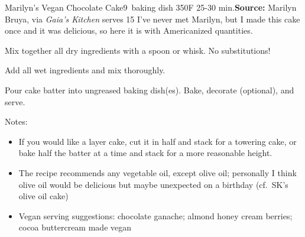 \begin{recipe}{Marilyn's Vegan Chocolate Cake}{9\inch{}\inch\ baking dish \hfill 350\0F \hfill 25-30 min.}{\textbf{Source:} Marilyn Bruya, via \textit{Gaia's Kitchen} \hfill serves 15}
  \freeform I've never met Marilyn, but I made this cake once and it was delicious, so here it is with Americanized quantities.

Mix together all dry ingredients with a spoon or whisk. No substitutions!

Add all wet ingredients and mix thoroughly.

\newstep Pour cake batter into ungreased baking dish(es). Bake, decorate (optional), and serve.

\freeform Notes:
\begin{itemize}
  \item If you would like a layer cake, cut it in half and stack for a towering cake, or bake half the batter at a time and stack for a more reasonable height.
  \item The recipe recommends any vegetable oil, except olive oil; personally I think olive oil would be delicious but maybe unexpected on a birthday (cf.\ SK's olive oil cake)
  \item Vegan serving suggestions: chocolate ganache; almond honey cream \And berries; cocoa buttercream made vegan
\end{itemize}
\end{recipe}